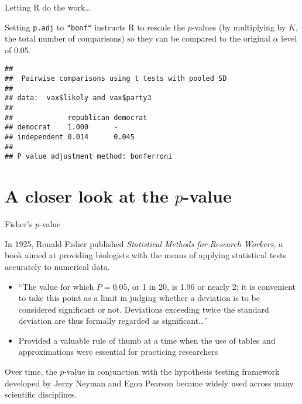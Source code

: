 \documentclass[
  ignorenonframetext,
  aspectratio=169]{beamer}
\newenvironment{Shaded}{\begin{snugshade}}{\end{snugshade}}
\newcommand{\AttributeTok}[1]{\textcolor[rgb]{0.13,0.29,0.53}{#1}}
\newcommand{\FunctionTok}[1]{\textcolor[rgb]{0.13,0.29,0.53}{\textbf{#1}}}
\newcommand{\NormalTok}[1]{#1}
\newcommand{\SpecialCharTok}[1]{\textcolor[rgb]{0.81,0.36,0.00}{\textbf{#1}}}
\newcommand{\StringTok}[1]{\textcolor[rgb]{0.31,0.60,0.02}{#1}}
\begin{document}
\begin{frame}[fragile]{Letting \textsf{R} do the work\ldots{}}
\protect\hypertarget{letting-do-the-work-2}{}
\small

Setting \texttt{p.adj} to \texttt{"bonf"} instructs R to rescale the
\(p\)-values (by multiplying by \(K\), the total number of comparisons)
so they can be compared to the original \(\alpha\) level of 0.05.

\vspace{0.3cm}

\scriptsize

\begin{Shaded}
\end{Shaded}

\begin{verbatim}
## 
##  Pairwise comparisons using t tests with pooled SD 
## 
## data:  vax$likely and vax$party3 
## 
##             republican democrat
## democrat    1.000      -       
## independent 0.014      0.045   
## 
## P value adjustment method: bonferroni
\end{verbatim}
\end{frame}

\hypertarget{a-closer-look-at-the-p-value}{%
\section{\texorpdfstring{A closer look at the
\(p\)-value}{A closer look at the p-value}}\label{a-closer-look-at-the-p-value}}

\begin{frame}{Fisher's \(p\)-value}
\protect\hypertarget{fishers-p-value}{}
\small

In 1925, Ronald Fisher published \emph{Statistical Methods for Research
Workers}, a book aimed at providing biologists with the means of
applying statistical tests accurately to numerical data.

\begin{itemize}
\item
  ``The value for which \(P = 0.05\), or 1 in 20, is 1.96 or nearly 2;
  it is convenient to take this point as a limit in judging whether a
  deviation is to be considered significant or not. Deviations exceeding
  twice the standard deviation are thus formally regarded as
  significant\ldots{}''
\item
  Provided a valuable rule of thumb at a time when the use of tables and
  approximations were essential for practicing researchers
\end{itemize}

Over time, the \(p\)-value in conjunction with the hypothesis testing
framework developed by Jerzy Neyman and Egon Pearson became widely used
across many scientific disciplines.
\end{frame}
\end{document}
